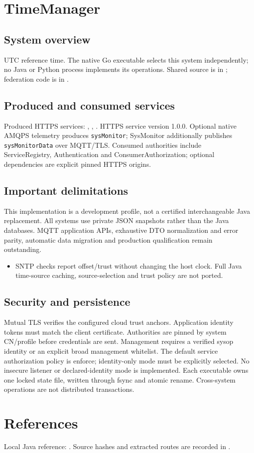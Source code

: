 \documentclass[a4paper]{arrowhead}
\begin{document}
\ArrowheadSetup
\section{TimeManager}
\subsection{System overview}
UTC reference time. The native Go executable selects this system independently; no Java or Python process implements its operations. Shared source is in ; federation code is in .
\subsection{Produced and consumed services}
Produced HTTPS services: , \allowbreak {}, \allowbreak {}.
HTTPS service version 1.0.0. Optional native AMQPS telemetry produces \texttt{sysMonitor}; SysMonitor additionally publishes \texttt{sysMonitorData} over MQTT/TLS. Consumed authorities include ServiceRegistry, Authentication and ConsumerAuthorization; optional dependencies are explicit pinned HTTPS origins.
\subsection{Important delimitations}
This implementation is a development profile, not a certified interchangeable Java replacement. All systems use private JSON snapshots rather than the Java databases. MQTT application APIs, exhaustive DTO normalization and error parity, automatic data migration and production qualification remain outstanding.
\begin{itemize}
\item SNTP checks report offset/trust without changing the host clock. Full Java time-source caching, source-selection and trust policy are not ported.
\end{itemize}
\subsection{Security and persistence}
Mutual TLS verifies the configured cloud trust anchors. Application identity tokens must match the client certificate. Authorities are pinned by system CN/profile before credentials are sent. Management requires a verified sysop identity or an explicit broad management whitelist. The default service authorization policy is enforce; identity-only mode must be explicitly selected. No insecure listener or declared-identity mode is implemented. Each executable owns one locked state file, written through fsync and atomic rename. Cross-system operations are not distributed transactions.
\section{References}
Local Java reference: . Source hashes and extracted routes are recorded in .
\end{document}
